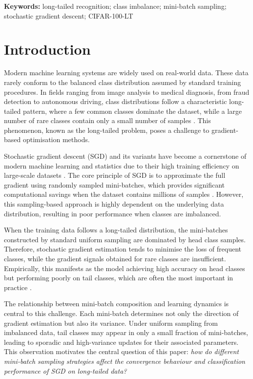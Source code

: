 \documentclass[12pt,a4paper]{article}
\begin{document}
\noindent\textbf{Keywords:} long-tailed recognition; class imbalance; mini-batch sampling; stochastic gradient descent; CIFAR-100-LT

\section{Introduction}
\label{sec:introduction}
Modern machine learning systems are widely used on real-world data. These data rarely conform to the balanced class distribution assumed by standard training procedures. In fields ranging from image analysis to medical diagnosis, from fraud detection to autonomous driving, class distributions follow a characteristic long-tailed pattern, where a few common classes dominate the dataset, while a large number of rare classes contain only a small number of samples \citep{zhang2023dive}. This phenomenon, known as the long-tailed problem, poses a challenge to gradient-based optimisation methods.

Stochastic gradient descent (SGD) and its variants have become a cornerstone of modern machine learning and statistics due to their high training efficiency on large-scale datasets \citep{bottou2018optimization}. The core principle of SGD is to approximate the full gradient using randomly sampled mini-batches, which provides significant computational savings when the dataset contains millions of samples \citep{robbins1951stochastic}. However, this sampling-based approach is highly dependent on the underlying data distribution, resulting in poor performance when classes are imbalanced.

When the training data follows a long-tailed distribution, the mini-batches constructed by standard uniform sampling are dominated by head class samples. Therefore, stochastic gradient estimation tends to minimise the loss of frequent classes, while the gradient signals obtained for rare classes are insufficient. Empirically, this manifests as the model achieving high accuracy on head classes but performing poorly on tail classes, which are often the most important in practice \citep{liu2019large, van2018inaturalist}.

The relationship between mini-batch composition and learning dynamics is central to this challenge. Each mini-batch determines not only the direction of gradient estimation but also its variance. Under uniform sampling from imbalanced data, tail classes may appear in only a small fraction of mini-batches, leading to sporadic and high-variance updates for their associated parameters. This observation motivates the central question of this paper: \textit{how do different mini-batch sampling strategies affect the convergence behaviour and classification performance of SGD on long-tailed data?}
\end{document}
